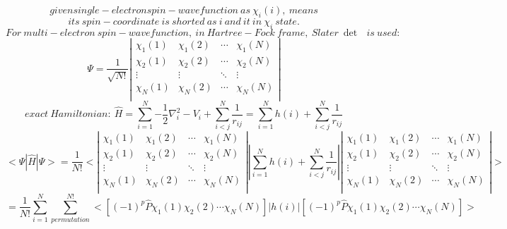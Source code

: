 $$
given single-electron spin-wavefunction\ as\ \chi _i\left( i \right) ,\ means
$$
$$
its\ spin-coordinate\ is\ shorted\ as\ i\ and\ it\ in\ \chi _i\ state.
$$
$$
For\ multi-electron\ spin-wavefunction,\ in\ Hartree-Fock\ frame,\ Slater\ \det\text{\ }is\ used:
$$
$$
\varPsi =\frac{1}{\sqrt{N!}}\left| \begin{matrix}
	\chi _1\left( 1 \right)&		\chi _1\left( 2 \right)&		\cdots&		\chi _1\left( N \right)\\
	\chi _2\left( 1 \right)&		\chi _2\left( 2 \right)&		\cdots&		\chi _2\left( N \right)\\
	\vdots&		\vdots&		\ddots&		\vdots\\
	\chi _N\left( 1 \right)&		\chi _N\left( 2 \right)&		\cdots&		\chi _N\left( N \right)\\
\end{matrix} \right|
$$
$$
exact\ Hamiltonian:\ \hat{H}=\sum_{i=1}^N{-\frac{1}{2}\nabla _{i}^{2}-V_i}+\sum_{i<j}^N{\frac{1}{r_{ij}}}=\sum_{i=1}^N{h\left( i \right)}+\sum_{i<j}^N{\frac{1}{r_{ij}}}
$$
$$
<\varPsi |\hat{H}|\varPsi >=\frac{1}{N!}<\left| \begin{matrix}
	\chi _1\left( 1 \right)&		\chi _1\left( 2 \right)&		\cdots&		\chi _1\left( N \right)\\
	\chi _2\left( 1 \right)&		\chi _2\left( 2 \right)&		\cdots&		\chi _2\left( N \right)\\
	\vdots&		\vdots&		\ddots&		\vdots\\
	\chi _N\left( 1 \right)&		\chi _N\left( 2 \right)&		\cdots&		\chi _N\left( N \right)\\
\end{matrix} \right||\sum_{i=1}^N{h\left( i \right)}+\sum_{i<j}^N{\frac{1}{r_{ij}}}|\left| \begin{matrix}
	\chi _1\left( 1 \right)&		\chi _1\left( 2 \right)&		\cdots&		\chi _1\left( N \right)\\
	\chi _2\left( 1 \right)&		\chi _2\left( 2 \right)&		\cdots&		\chi _2\left( N \right)\\
	\vdots&		\vdots&		\ddots&		\vdots\\
	\chi _N\left( 1 \right)&		\chi _N\left( 2 \right)&		\cdots&		\chi _N\left( N \right)\\
\end{matrix} \right|>
$$
$$
=\frac{1}{N!}\sum_{i=1}^N{\sum_{permutation}^{N!}{<\left[ \left( -1 \right) ^p\hat{P}\chi _1\left( 1 \right) \chi _2\left( 2 \right) \cdots \chi _N\left( N \right) \right] |h\left( i \right) |\left[ \left( -1 \right) ^p\hat{P}\chi _1\left( 1 \right) \chi _2\left( 2 \right) \cdots \chi _N\left( N \right) \right] >}}
$$
